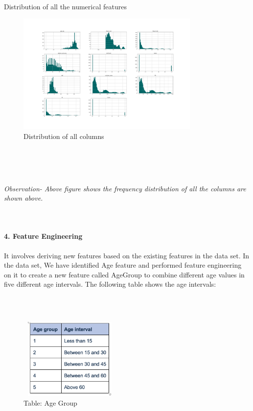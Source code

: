 \documentclass[a4paper, 10pt, conference]{ieeeconf}      %
\begin{document}
\\\
\\Distribution of all the numerical features
\begin{figure}[htp]
    \centering
    \includegraphics[width=9cm,height=6cm]{Images/Histogram.png}
    \caption{Distribution of all columns}
    \label{fig: Destribution of all columns}
\end{figure}
\\\

\\\textit{Observation- Above figure shows the frequency distribution of all the columns are shown above.}
\\
\\
\\
\\
\textbf{4. Feature Engineering}
\\\
\\It involves deriving new features based on the existing features in the data set. In the data set, We have identified Age feature and performed feature engineering on it to create a new feature called AgeGroup to combine different age values in
five different age intervals. The following table shows the age intervals:

\\\
\begin{figure}[htp]
    \centering
    \includegraphics[width=5cm,height=4cm]{Images/agegrouptable.png}
    \caption{Table: Age Group}
    \label{fig:agegrouptable}
\end{figure}
\end{document}
